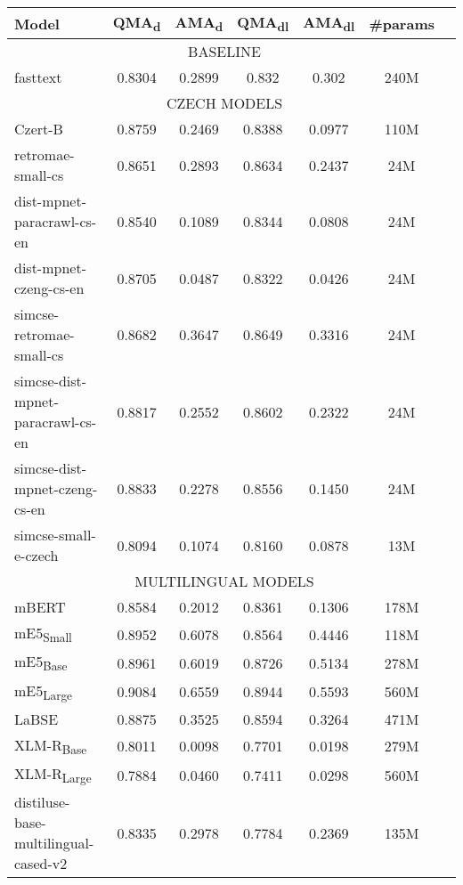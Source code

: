 \begin{table*}[t!]
    \centering
    \begin{tabular}{lcccccc}
      \toprule
      \textbf{Model} & \textbf{QMA}\textsubscript{d} & \textbf{AMA}\textsubscript{d} & \textbf{QMA}\textsubscript{dl} & \textbf{AMA}\textsubscript{dl} & \textbf{\#params} \\
      \midrule
      \multicolumn{6}{c}{BASELINE} \\
      \hline
      fasttext & 0.8304 & 0.2899 & 0.832 & 0.302 & 240M \\
      \hline
      \multicolumn{6}{c}{CZECH MODELS} \\
      \hline
      Czert-B & 0.8759 & 0.2469 & 0.8388 & 0.0977 & 110M \\
      retromae-small-cs & 0.8651 & 0.2893 & 0.8634 & 0.2437 & 24M \\
      dist-mpnet-paracrawl-cs-en & 0.8540 & 0.1089 & 0.8344 & 0.0808 & 24M \\
      dist-mpnet-czeng-cs-en & 0.8705 & 0.0487 & 0.8322 & 0.0426 & 24M \\
      simcse-retromae-small-cs & 0.8682 & 0.3647 & 0.8649 & 0.3316 & 24M \\
      simcse-dist-mpnet-paracrawl-cs-en & 0.8817 & 0.2552 & 0.8602 & 0.2322 & 24M \\
      simcse-dist-mpnet-czeng-cs-en & 0.8833 & 0.2278 & 0.8556 & 0.1450 & 24M \\
      simcse-small-e-czech & 0.8094 & 0.1074 & 0.8160 & 0.0878 & 13M \\
      \hline
      \multicolumn{6}{c}{MULTILINGUAL MODELS} \\
      \hline
      mBERT & 0.8584 & 0.2012 & 0.8361 & 0.1306 & 178M \\
      mE5\textsubscript{Small} & 0.8952 & 0.6078 & 0.8564 & 0.4446 & 118M \\
      mE5\textsubscript{Base} & 0.8961 & 0.6019 & 0.8726 & 0.5134 & 278M \\
      mE5\textsubscript{Large} & 0.9084 & 0.6559 & 0.8944 & 0.5593 & 560M \\
      LaBSE & 0.8875 & 0.3525 & 0.8594 & 0.3264 & 471M \\
      XLM-R\textsubscript{Base} & 0.8011 & 0.0098 & 0.7701 & 0.0198 & 279M \\
      XLM-R\textsubscript{Large} & 0.7884 & 0.0460 & 0.7411 & 0.0298 & 560M \\
      distiluse-base-multilingual-cased-v2 & 0.8335 & 0.2978 & 0.7784 & 0.2369 & 135M \\

\end{tabular}
\end{table*}
